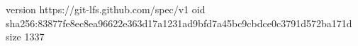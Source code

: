 version https://git-lfs.github.com/spec/v1
oid sha256:83877fe8ec8ea96622e363d17a1231ad9bfd7a45bc9cbdce0c3791d572ba171d
size 1337
